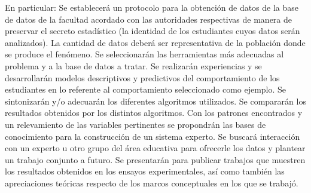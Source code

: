
En particular:
Se establecerá un protocolo para la obtención de datos de la base de datos de la facultad acordado con las
autoridades respectivas de manera de preservar el secreto estadístico (la identidad de los estudiantes cuyos datos serán
analizados). La cantidad de datos deberá ser representativa de la población donde se produce el fenómeno.
Se seleccionarán las herramientas más adecuadas al problema y a la base de datos a tratar.
Se realizarán experiencias y se desarrollarán modelos descriptivos y predictivos del comportamiento de los
estudiantes en lo referente al comportamiento seleccionado como ejemplo. Se sintonizarán y/o adecuarán los diferentes
algoritmos utilizados.
Se compararán los resultados obtenidos por los distintos algoritmos.
Con los patrones encontrados y un relevamiento de las variables pertinentes se propondrán las bases de
conocimiento para la construcción de un sistema experto.
Se buscará interacción con un experto u otro grupo del área educativa para ofrecerle los datos y plantear un trabajo
conjunto a futuro.
Se presentarán para publicar trabajos que muestren los resultados obtenidos en los ensayos experimentales, así
como también las apreciaciones teóricas respecto de los marcos conceptuales en los que se trabajó.